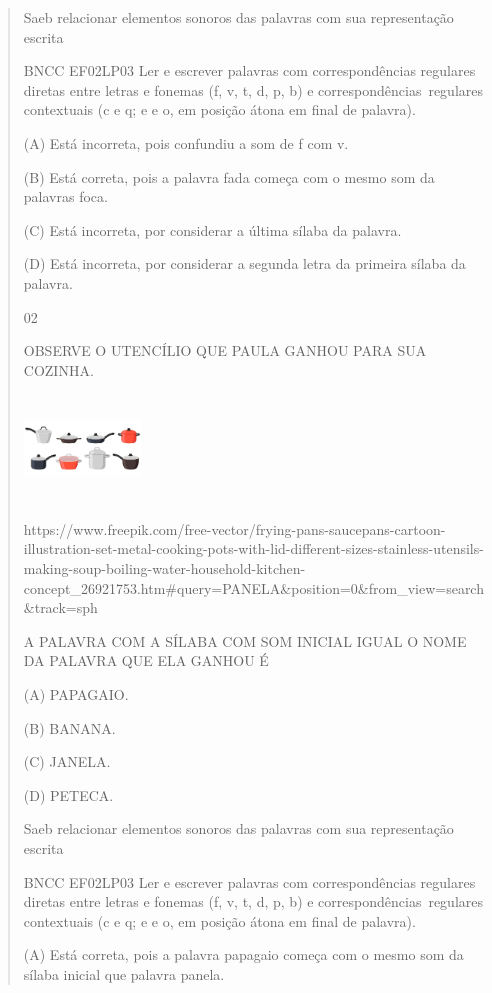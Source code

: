 {{{{\begin{verse}
{{\begin{escolha}
{{{{{Saeb relacionar elementos sonoros das palavras com sua representação
escrita

BNCC EF02LP03 Ler e escrever palavras com correspondências regulares
diretas entre letras e fonemas (f, v, t, d, p, b) e
correspondências~regulares contextuais (c e q; e e o, em posição átona
em final de palavra).

\protect\hypertarget{_Hlk129501253}{}{}(A) Está incorreta, pois
confundiu a som de f com v.

(B) Está correta, pois a palavra fada começa com o mesmo som da palavras
foca.

(C) Está incorreta, por considerar a última sílaba da palavra.

(D) Está incorreta, por considerar a segunda letra da primeira sílaba da
palavra.

\num{02}

OBSERVE O UTENCÍLIO QUE PAULA GANHOU PARA SUA COZINHA.

\includegraphics[width=1.22222in,height=1.11389in]{media/image19.jpeg}

https://www.freepik.com/free-vector/frying-pans-saucepans-cartoon-illustration-set-metal-cooking-pots-with-lid-different-sizes-stainless-utensils-making-soup-boiling-water-household-kitchen-concept\_26921753.htm\#query=PANELA\&position=0\&from\_view=search\&track=sph

\protect\hypertarget{_Hlk129268378}{}{}A PALAVRA COM A SÍLABA COM SOM
INICIAL IGUAL O NOME DA PALAVRA QUE ELA GANHOU É

(A) PAPAGAIO.

(B) BANANA.

(C) JANELA.

(D) PETECA.

Saeb relacionar elementos sonoros das palavras com sua representação
escrita

BNCC EF02LP03 Ler e escrever palavras com correspondências regulares
diretas entre letras e fonemas (f, v, t, d, p, b) e
correspondências~regulares contextuais (c e q; e e o, em posição átona
em final de palavra).

(A) Está correta, pois a palavra papagaio começa com o mesmo som da
sílaba inicial que palavra panela.

}}}}}
\end{escolha}}}
\end{verse}}}}}
